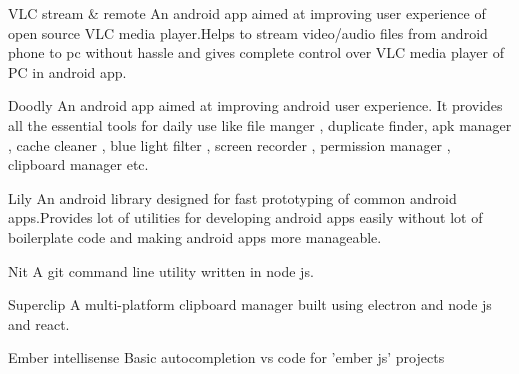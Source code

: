 
\begin{cventries}
  \cvproject
    {VLC stream \& remote} %
    { \quad An android app aimed at improving user experience of open source VLC media player.Helps to stream video/audio files from android phone to pc without hassle and gives complete control over VLC media player of PC in android app.} %
  
  \cvproject
    {Doodly}
    { \quad An android app aimed at improving android user experience. It provides all the essential tools for daily use like file manger , duplicate finder, apk manager , cache cleaner , blue light filter , screen recorder , permission manager , clipboard manager etc.}

  \cvproject
    {Lily}
    { \quad An android library designed for fast prototyping of common android apps.Provides lot of utilities for developing android apps easily without lot of boilerplate code and making android apps more manageable.}

  \cvproject
    {Nit}
    { \quad A git command line utility written in node js.}

  \cvproject
    {Superclip}
    { \quad A multi-platform clipboard manager built using electron and node js and react.}
  
  \cvproject
    {Ember intellisense}
    { \quad Basic autocompletion vs code for 'ember js' projects}

\end{cventries}
